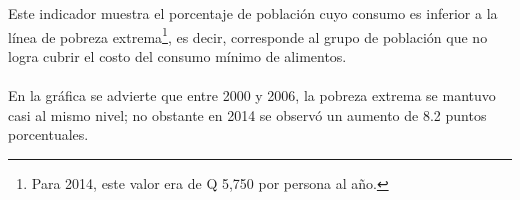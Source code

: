 Este indicador muestra el porcentaje de población cuyo consumo es inferior a la línea de pobreza extrema\footnote{Para 2014, este valor era de Q 5,750 por persona al año.}, es decir, corresponde al grupo de población que no logra cubrir el costo del consumo mínimo de alimentos. \\\\ 
En la gráfica se advierte que entre 2000 y 2006,  la pobreza extrema se mantuvo casi  al mismo nivel; no obstante en  2014 se observó un aumento de 8.2 puntos porcentuales.